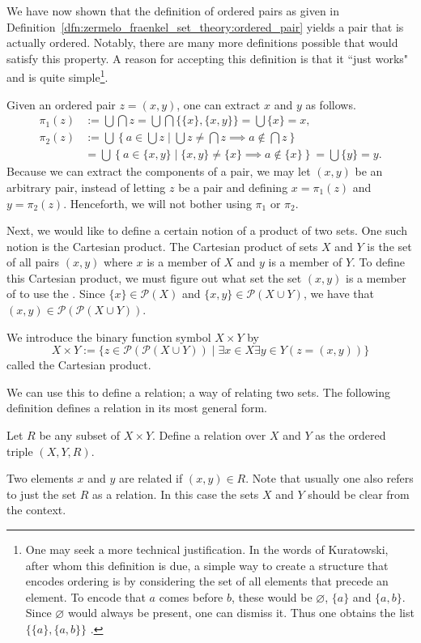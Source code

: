 \documentclass[../main.tex]{subfiles}
\begin{document}
We have now shown that the definition of ordered pairs as given in Definition~\ref{dfn:zermelo_fraenkel_set_theory:ordered_pair} yields a pair that is actually ordered. Notably, there are many more definitions possible that would satisfy this property. A reason for accepting this definition is that it ``just works" and is quite simple\footnote{One may seek a more technical justification. In the words of Kuratowski, after whom this definition is due, a simple way to create a structure that encodes ordering is by considering the set of all elements that precede an element. To encode that $a$ comes before $b$, these would be $\varnothing$, $\{a\}$ and $\{a,b\}$. Since $\varnothing$ would always be present, one can dismiss it. Thus one obtains the list $\{\{a\},\{a,b\}\}$ \cite{Kuratowski1921}.}.

Given an ordered pair $z=(x,y)$, one can extract $x$ and $y$ as follows.
\begin{align*}
    \pi_1(z) & :=\bigcup\bigcap z=\bigcup\bigcap\{\{x\},\{x,y\}\}=\bigcup\{x\}=x, \\
    \pi_2(z) & :=\bigcup\left\{a\in\bigcup z\mathrel{}\middle\vert\mathrel{}\bigcup z\neq\bigcap z\implies a\notin\bigcap z\right\} \\
    & =\bigcup\left\{a\in\{x,y\}\mid\{x,y\}\neq\{x\}\implies a\notin\{x\}\right\}=\bigcup\{y\}=y.
\end{align*}
Because we can extract the components of a pair, we may let $(x,y)$ be an arbitrary pair, instead of letting $z$ be a pair and defining $x=\pi_1(z)$ and $y=\pi_2(z)$. Henceforth, we will not bother using $\pi_1$ or $\pi_2$.

Next, we would like to define a certain notion of a product of two sets. One such notion is the Cartesian product. The Cartesian product of sets $X$ and $Y$ is the set of all pairs $(x,y)$ where $x$ is a member of $X$ and $y$ is a member of $Y$. To define this Cartesian product, we must figure out what set the set $(x,y)$ is a member of to use the . Since $\{x\}\in\mathcal{P}(X)$ and $\{x,y\}\in\mathcal{P}(X\cup Y)$, we have that $(x,y)\in\mathcal{P}(\mathcal{P}(X\cup Y))$.
\begin{definition}
    We introduce the binary function symbol $X\times Y$ by
    \begin{equation*}
        X\times Y:=\{z\in\mathcal{P}(\mathcal{P}(X\cup Y))\mid\exists x\in X\exists y\in Y(z=(x,y))\}
    \end{equation*}
    called the Cartesian product.
\end{definition}
We can use this to define a relation; a way of relating two sets. The following definition defines a relation in its most general form.
\begin{definition}[Relation]\label{dfn:zermelo_fraenkel_set_theory:relation}
    Let $R$ be any subset of $X\times Y$. Define a relation over $X$ and $Y$ as the ordered triple $(X,Y,R)$.
\end{definition}
Two elements $x$ and $y$ are related if $(x,y)\in R$. Note that usually one also refers to just the set $R$ as a relation. In this case the sets $X$ and $Y$ should be clear from the context.
\end{document}
